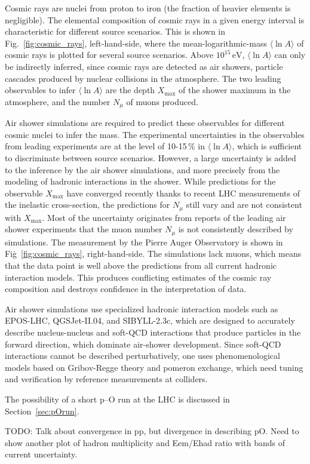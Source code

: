 \documentclass[../report.tex]{subfiles}
\newcommand{\mlna}{\langle \ln\!A \rangle}
\newcommand{\nmu}{N_\mu}
\newcommand{\xmax}{X_\text{max}}
\newcommand{\si}[1]{\ensuremath{\text{#1}}}
\begin{document}
Cosmic rays are nuclei from proton to iron (the fraction of heavier elements is negligible). The elemental composition of cosmic rays in a given energy interval is characteristic for different source scenarios. This is shown in Fig.~\ref{fig:cosmic_rays}, left-hand-side, where the mean-logarithmic-mass $\mlna$ of cosmic rays is plotted for several source scenarios. Above $10^{15}$\,\si{eV}, $\mlna$ can only be indirectly inferred, since cosmic rays are detected as air showers, particle cascades produced by nuclear collisions in the atmosphere. The two leading observables to infer $\mlna$ are the depth $\xmax$ of the shower maximum in the atmosphere, and the number $\nmu$ of muons produced.

Air shower simulations are required to predict these observables for different cosmic nuclei to infer the mass. The experimental uncertainties in the observables from leading experiments are at the level of 10-15\,\% in $\mlna$, which is sufficient to discriminate between source scenarios. However, a large uncertainty is added to the inference by the air shower simulations, and more precisely from the modeling of hadronic interactions in the shower. While predictions for the observable $\xmax$ have converged recently thanks to recent LHC measurements of the inelastic cross-section, the predictions for $\nmu$ still vary and are not consistent with $\xmax$. Most of the uncertainty originates from reports of the leading air shower experiments\cite{Aab:2014pza,Dembinski:2017zkb,Kokoulin:2009zz,AbuZayyad:1999xa,Aab:2014dua} that the muon number $\nmu$ is not consistently described by simulations. The measurement by the Pierre Auger Observatory is shown in Fig\.~\ref{fig:cosmic_rays}, right-hand-side. The simulations lack muons, which means that the data point is well above the predictions from all current hadronic interaction models. This produces conflicting estimates of the cosmic ray composition and destroys confidence in the interpretation of data.

Air shower simulations use specialized hadronic interaction models such as EPOS-LHC\cite{Werner:2005jf}, \mbox{QGSJet-II.04}\cite{Ostapchenko:2010vb}, and SIBYLL-2.3c\cite{Riehn:2017mfm}, which are designed to accurately describe nucleus-nucleus and soft-QCD interactions that produce particles in the forward direction, which dominate air-shower development. Since soft-QCD interactions cannot be described perturbatively, one uses phenomenological models based on Gribov-Regge theory and pomeron exchange, which need tuning and verification by reference measurements at colliders.

The possibility of a short p--O run at the LHC is discussed in Section~\ref{sec:pOrun}.

TODO: Talk about convergence in pp, but divergence in describing pO. Need to show another plot of hadron multiplicity and Eem/Ehad ratio with bands of current uncertainty.
\end{document}
